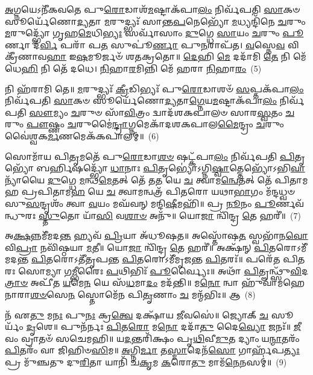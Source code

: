 {\anuvakamend[{\-\ul{𑌵}\-𑌯𑌂 𑌯𑌦𑍍 𑌵𑌿𑍞᳴\-\ul{𑌶}\-𑌤𑌿𑌶𑍍𑌚᳴}]}%

\-\ul{𑌅}\-𑌗𑍍𑌨𑌯𑍇\-𑌽𑌨𑍀᳴𑌕𑌵𑌤𑍇 𑌪𑍁\-\ul{𑌰𑍋}\-𑌡𑌾𑌶᳴\-\-\ul{𑌮}\-𑌷𑍍𑌟𑌾\-𑌕᳴𑌪𑌾\-\ul{𑌲𑌂} 𑌨𑌿𑌰𑍍𑌵᳴𑌪𑌤𑌿 \ul{𑌸𑌾}\-𑌕𑍞 𑌸𑍂𑌰𑍍𑌯𑍇᳴𑌣𑍋\-\ul{𑌦𑍍𑌯}\-𑌤𑌾 \ul{𑌮}\-𑌰𑍁𑌦𑍍𑌭𑍍𑌯𑌃᳴ 𑌸𑌾𑌨𑍍𑌤\-\ul{𑌪}\-𑌨𑍇𑌭𑍍𑌯𑍋᳴ \ul{𑌮}\-𑌧𑍍𑌯𑌨𑍍𑌦𑌿᳴𑌨𑍇 \ul{𑌚}\-𑌰𑍁𑌂 \ul{𑌮}\-𑌰𑍁𑌦𑍍𑌭𑍍𑌯𑍋᳴ 𑌗𑍃𑌹\-\ul{𑌮𑍇}\-𑌧𑌿\-\ul{𑌭𑍍𑌯𑌃} 𑌸𑌰𑍍𑌵𑌾᳴𑌸𑌾𑌂 \ul{𑌦𑍁}\-𑌗𑍍𑌧𑍇 \ul{𑌸𑌾}\-𑌯𑌂 \ul{𑌚}\-𑌰𑍁𑌂 \ul{𑌪𑍂}\-𑌰𑍍𑌣𑌾 𑌦᳴\-\ul{𑌰𑍍𑌵𑌿} 𑌪𑌰𑌾᳴ 𑌪\-\ul{𑌤} 𑌸𑍁𑌪𑍂॑\-\ul{𑌰𑍍𑌣𑌾} 𑌪𑍁\-\ul{𑌨}\-𑌰𑌾𑌪᳴𑌤। \ul{𑌵}\-𑌸𑍍𑌨𑍇\-\ul{𑌵} 𑌵𑌿 𑌕𑍍𑌰𑍀᳴𑌣𑌾𑌵\-\ul{𑌹𑌾} 𑌇\-\ul{𑌷}\-𑌮𑍂𑌰𑍍𑌜𑍞᳴ 𑌶𑌤𑌕𑍍𑌰𑌤𑍋॥ \ul{𑌦𑍇}\-𑌹𑌿 \ul{𑌮𑍇} 𑌦𑌦𑌾᳴𑌮𑌿 \ul{𑌤𑍇} 𑌨𑌿 𑌮𑍇᳴ 𑌧𑍇\-\ul{𑌹𑌿} 𑌨𑌿 𑌤𑍇᳴ 𑌦𑌧𑍇। \ul{𑌨𑌿}\-𑌹𑌾\-\ul{𑌰}\-𑌮𑌿𑌨𑍍𑌨𑌿 𑌮𑍇᳴ 𑌹𑌰𑌾 \ul{𑌨𑌿}\-𑌹𑌾\-\ul{𑌰𑌂}\-~(5)


𑌨𑌿 𑌹᳴𑌰𑌾𑌮𑌿 𑌤𑍇॥ \ul{𑌮}\-𑌰𑍁𑌦𑍍𑌭𑍍𑌯𑌃᳴ \ul{𑌕𑍍𑌰𑍀}\-𑌡𑌿𑌭𑍍𑌯𑌃᳴ 𑌪𑍁\-\ul{𑌰𑍋}\-𑌡𑌾𑌶𑍞᳴ \ul{𑌸}\-𑌪𑍍𑌤\-𑌕᳴𑌪𑌾\-\ul{𑌲𑌂} 𑌨𑌿𑌰𑍍𑌵᳴𑌪𑌤𑌿 \ul{𑌸𑌾}\-𑌕𑍞 𑌸𑍂𑌰𑍍𑌯𑍇᳴𑌣𑍋\-\ul{𑌦𑍍𑌯}\-𑌤𑌾\-\ul{𑌗𑍍𑌨𑍇}\-𑌯\-\ul{𑌮}\-𑌷𑍍𑌟𑌾\-𑌕᳴𑌪𑌾\-\ul{𑌲𑌂} 𑌨𑌿𑌰𑍍𑌵᳴𑌪𑌤𑌿 \ul{𑌸𑍗}\-𑌮𑍍𑌯𑌂 \ul{𑌚}\-𑌰𑍁𑍞 𑌸𑌾᳴\-\ul{𑌵𑌿}\-𑌤𑍍𑌰𑌂 𑌦𑍍𑌵𑌾𑌦᳴𑌶\-𑌕𑌪𑌾𑌲𑍞 𑌸𑌾𑌰\-\ul{𑌸𑍍𑌵}\-𑌤𑌂 \ul{𑌚}\-𑌰𑍁𑌂 \ul{𑌪𑍗}\-𑌷𑍍𑌣𑌂 \ul{𑌚}\-𑌰𑍁𑌮𑍈॑\-\ul{𑌨𑍍𑌦𑍍𑌰𑌾}\-𑌗𑍍𑌨𑌮𑍇𑌕𑌾᳴\-𑌦𑌶\-𑌕𑌪𑌾𑌲\-\ul{𑌮𑍈}\-𑌨𑍍𑌦𑍍𑌰𑌂 \ul{𑌚}\-𑌰𑍁𑌂 𑌵𑍈॑𑌶𑍍𑌵𑌕\-\ul{𑌰𑍍𑌮}\-𑌣𑌮𑍇𑌕᳴𑌕𑌪𑌾𑌲𑌮𑍍॥~(6)

{\anuvakamend[{\-\ul{𑌹}\-\-\ul{𑌰𑌾} \ul{𑌨𑌿}\-𑌹𑌾𑌰𑌂᳴ \ul{𑌤𑍍𑌰𑌿}\-\-\ul{𑍞}\-𑌶𑌚𑍍𑌚᳴}]}%

𑌸𑍋𑌮𑌾᳴𑌯 𑌪𑌿\-\ul{𑌤𑍃}\-𑌮𑌤𑍇᳴ 𑌪𑍁\-\ul{𑌰𑍋}\-𑌡𑌾\-\ul{𑌶}\-\-\ul{𑍞} 𑌷𑌟𑍍\-𑌕᳴𑌪𑌾\-\ul{𑌲𑌂} 𑌨𑌿𑌰𑍍𑌵᳴𑌪𑌤𑌿 \ul{𑌪𑌿}\-𑌤𑍃𑌭𑍍𑌯𑍋᳴ 𑌬𑌰𑍍\mbox{}\-\ul{𑌹𑌿}\-𑌷𑌦𑍍𑌭𑍍𑌯𑍋᳴ \ul{𑌧𑌾}\-𑌨𑌾𑌃 \ul{𑌪𑌿}\-𑌤𑍃𑌭𑍍𑌯𑍋॑\-𑌽𑌗𑍍𑌨𑌿\-\ul{𑌷𑍍𑌵𑌾}\-𑌤𑍍𑌤𑍇𑌭𑍍𑌯𑍋᳴\-𑌽𑌭𑌿\-\ul{𑌵𑌾}\-𑌨𑍍𑌯𑌾᳴𑌯𑍈 \ul{𑌦𑍁}\-𑌗𑍍𑌧𑍇 \ul{𑌮}\-𑌨𑍍𑌥\-\ul{𑌮𑍇}\-𑌤𑌤𑍍 𑌤𑍇᳴ 𑌤\-\ul{𑌤} 𑌯𑍇 \ul{𑌚} 𑌤𑍍𑌵𑌾𑌮\-\ul{𑌨𑍍𑌵𑍇}\-𑌤𑌤𑍍 𑌤𑍇᳴ 𑌪𑌿𑌤𑌾𑌮𑌹 𑌪𑍍𑌰𑌪𑌿𑌤𑌾𑌮\-\ul{𑌹} 𑌯𑍇 \ul{𑌚} 𑌤𑍍𑌵𑌾𑌮𑌨𑍍𑌵𑌤𑍍𑌰᳴ 𑌪𑌿𑌤𑌰𑍋 𑌯𑌥𑌾\-\ul{𑌭𑌾}\-𑌗𑌂 𑌮᳴𑌨𑍍𑌦𑌧𑍍𑌵𑍞 𑌸𑍁\-\ul{𑌸}\-𑌨𑍍𑌦𑍃𑌶𑌂᳴ 𑌤𑍍𑌵𑌾 \ul{𑌵}\-𑌯𑌂 𑌮𑌘᳴𑌵𑌨𑍍 𑌮𑌨𑍍𑌦𑌿\-\ul{𑌷𑍀}\-𑌮𑌹𑌿᳴॥ 𑌪𑍍𑌰 \ul{𑌨𑍂}\-𑌨𑌂 \ul{𑌪𑍂}\-𑌰𑍍𑌣𑌵᳴𑌨𑍍𑌧𑍁𑌰𑌃 \ul{𑌸𑍍𑌤𑍁}\-𑌤𑍋 𑌯𑌾᳴\-\ul{𑌸𑌿} 𑌵\-\ul{𑌶𑌾}\-\-\ul{𑍞} 𑌅𑌨𑍁᳴॥ 𑌯𑍋\-\ul{𑌜𑌾} 𑌨𑍍𑌵𑌿᳴𑌨𑍍𑌦𑍍𑌰 \ul{𑌤𑍇} 𑌹𑌰𑍀॑॥~(7)

𑌅\-\ul{𑌕𑍍𑌷}\-𑌨𑍍𑌨𑌮𑍀᳴𑌮𑌦\-\ul{𑌨𑍍𑌤} 𑌹𑍍𑌯𑌵᳴ \ul{𑌪𑍍𑌰𑌿}\-𑌯𑌾 𑌅᳴𑌧𑍂𑌷𑌤॥ 𑌅𑌸𑍍𑌤𑍋᳴𑌷\-\ul{𑌤} 𑌸𑍍𑌵𑌭𑌾᳴𑌨\-\ul{𑌵𑍋} 𑌵𑌿\-\ul{𑌪𑍍𑌰𑌾} 𑌨𑌵𑌿᳴𑌷𑍍𑌠𑌯𑌾 \ul{𑌮}\-𑌤𑍀॥ 𑌯𑍋\-\ul{𑌜𑌾} 𑌨𑍍𑌵𑌿᳴𑌨𑍍𑌦𑍍𑌰 \ul{𑌤𑍇} 𑌹𑌰𑍀॑॥ 𑌅𑌕𑍍𑌷᳴𑌨𑍍 \ul{𑌪𑌿}\-𑌤𑌰𑍋\-𑌽𑌮𑍀᳴𑌮𑌦𑌨𑍍𑌤 \ul{𑌪𑌿}\-𑌤𑌰𑍋\-𑌽𑌤𑍀᳴𑌤𑍃𑌪𑌨𑍍𑌤 \ul{𑌪𑌿}\-𑌤𑌰𑍋\-𑌽𑌮𑍀᳴𑌮𑍃𑌜𑌨𑍍𑌤 \ul{𑌪𑌿}\-𑌤𑌰𑌃᳴॥ 𑌪𑌰𑍇᳴𑌤 𑌪𑌿𑌤𑌰𑌃 𑌸𑍋𑌮𑍍𑌯𑌾 𑌗\-\ul{𑌮𑍍𑌭𑍀}\-𑌰𑍈𑌃 \ul{𑌪}\-𑌥𑌿𑌭𑌿𑌃᳴ \ul{𑌪𑍂}\-𑌰𑍍𑌵𑍍𑌯𑍈𑌃॥ 𑌅𑌥𑌾᳴ \ul{𑌪𑌿}\-𑌤𑍄𑌨𑍍𑌥𑍍𑌸𑍁᳴\-\ul{𑌵𑌿}\-𑌦\-\ul{𑌤𑍍𑌰𑌾}\-\-\ul{𑍞} 𑌅𑌪𑍀᳴𑌤 \ul{𑌯}\-𑌮𑍇\-\ul{𑌨} 𑌯𑍇 𑌸᳴\-\ul{𑌧}\-𑌮𑌾\-\ul{𑌦𑌂} 𑌮𑌦᳴𑌨𑍍𑌤𑌿॥ 𑌮\-\ul{𑌨𑍋} 𑌨𑍍𑌵𑌾 𑌹𑍁᳴𑌵𑌾𑌮𑌹𑍇 𑌨𑌾𑌰𑌾\-\ul{𑌶}\-\-\ul{𑍞}\-𑌸𑍇\-\ul{𑌨} 𑌸𑍍𑌤𑍋𑌮𑍇᳴𑌨 𑌪𑌿\-\ul{𑌤𑍃}\-𑌣𑌾𑌂 \ul{𑌚} 𑌮𑌨𑍍𑌮᳴𑌭𑌿𑌃॥ 𑌆~(8)

𑌨᳴ 𑌏\-\ul{𑌤𑍁} 𑌮\-\ul{𑌨𑌃} 𑌪𑍁\-\ul{𑌨𑌃} 𑌕𑍍𑌰\-\ul{𑌤𑍍𑌵𑍇} 𑌦𑌕𑍍𑌷𑌾᳴𑌯 \ul{𑌜𑍀}\-𑌵𑌸𑍇॑॥ 𑌜𑍍𑌯𑍋𑌕𑍍 \ul{𑌚} 𑌸𑍂𑌰𑍍𑌯𑌂᳴ \ul{𑌦𑍃}\-𑌶𑍇॥ 𑌪𑍁𑌨᳴𑌰𑍍𑌨𑌃 \ul{𑌪𑌿}\-𑌤\-\ul{𑌰𑍋} 𑌮\-\ul{𑌨𑍋} 𑌦𑌦𑌾᳴\-\ul{𑌤𑍁} 𑌦𑍈\-\ul{𑌵𑍍𑌯𑍋} 𑌜𑌨𑌃᳴॥ \ul{𑌜𑍀}\-𑌵𑌂 𑌵𑍍𑌰𑌾𑌤𑍞᳴ 𑌸𑌚𑍇𑌮𑌹𑌿॥ 𑌯\-\ul{𑌦}\-𑌨𑍍𑌤𑌰𑌿᳴𑌕𑍍𑌷𑌂 𑌪𑍃\-\ul{𑌥𑌿}\-𑌵𑍀\-\ul{𑌮𑍁}\-𑌤 𑌦𑍍𑌯𑌾𑌂 𑌯\-\ul{𑌨𑍍𑌮𑌾}\-𑌤𑌰𑌂᳴ \ul{𑌪𑌿}\-𑌤𑌰𑌂᳴ 𑌵𑌾 𑌜𑌿𑌹𑌿𑍞\-\ul{𑌸𑌿}\-𑌮॥ \ul{𑌅}\-𑌗𑍍𑌨𑌿\-\ul{𑌰𑍍𑌮𑌾} 𑌤\-\ul{𑌸𑍍𑌮𑌾}\-𑌦𑍇𑌨᳴\-\ul{𑌸𑍋} 𑌗𑌾𑌰𑍍\mbox{}𑌹᳴𑌪\-\ul{𑌤𑍍𑌯𑌃} 𑌪𑍍𑌰 𑌮𑍁᳴𑌞𑍍𑌚𑌤𑍁 𑌦𑍁\-\ul{𑌰𑌿}\-𑌤𑌾 𑌯𑌾𑌨𑌿᳴ 𑌚\-\ul{𑌕𑍃}\-𑌮 \ul{𑌕}\-𑌰𑍋\-\ul{𑌤𑍁} 𑌮𑌾𑌮᳴\-\ul{𑌨𑍇}\-𑌨𑌸𑌮𑍍॑॥~(9)

